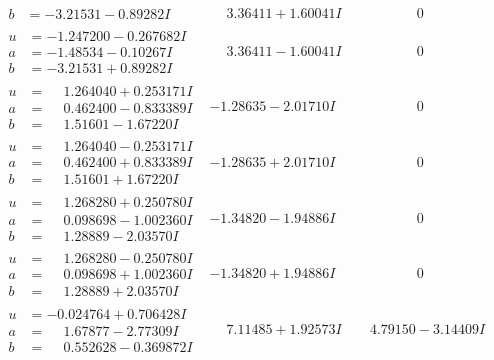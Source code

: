 \documentclass[1p]{elsarticle_modified}
\theoremstyle{definition}
\begin{document}
$$\begin{array}{c|c|c}
\begin{aligned}
b &= -3.21531 - 0.89282 I\end{aligned}
 & \phantom{-}3.36411 + 1.60041 I & \phantom{-0.000000 } 0 \\ \hline\begin{aligned}
u &= -1.247200 - 0.267682 I \\
a &= -1.48534 - 0.10267 I \\
b &= -3.21531 + 0.89282 I\end{aligned}
 & \phantom{-}3.36411 - 1.60041 I & \phantom{-0.000000 } 0 \\ \hline\begin{aligned}
u &= \phantom{-}1.264040 + 0.253171 I \\
a &= \phantom{-}0.462400 - 0.833389 I \\
b &= \phantom{-}1.51601 - 1.67220 I\end{aligned}
 & -1.28635 - 2.01710 I & \phantom{-0.000000 } 0 \\ \hline\begin{aligned}
u &= \phantom{-}1.264040 - 0.253171 I \\
a &= \phantom{-}0.462400 + 0.833389 I \\
b &= \phantom{-}1.51601 + 1.67220 I\end{aligned}
 & -1.28635 + 2.01710 I & \phantom{-0.000000 } 0 \\ \hline\begin{aligned}
u &= \phantom{-}1.268280 + 0.250780 I \\
a &= \phantom{-}0.098698 - 1.002360 I \\
b &= \phantom{-}1.28889 - 2.03570 I\end{aligned}
 & -1.34820 - 1.94886 I & \phantom{-0.000000 } 0 \\ \hline\begin{aligned}
u &= \phantom{-}1.268280 - 0.250780 I \\
a &= \phantom{-}0.098698 + 1.002360 I \\
b &= \phantom{-}1.28889 + 2.03570 I\end{aligned}
 & -1.34820 + 1.94886 I & \phantom{-0.000000 } 0 \\ \hline\begin{aligned}
u &= -0.024764 + 0.706428 I \\
a &= \phantom{-}1.67877 - 2.77309 I \\
b &= \phantom{-}0.552628 - 0.369872 I\end{aligned}
 & \phantom{-}7.11485 + 1.92573 I & \phantom{-}4.79150 - 3.14409 I \\ \hline\begin{aligned}

\end{aligned}
\end{array}$$
\end{document}
